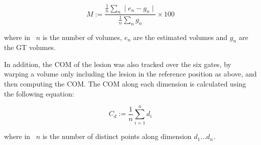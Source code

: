                \begin{equation} \label{eq:impact_of_tof_on_respiratory_motion_model_estimation_using_pre_gated_no_intra_cycle_motion_nac_pet_methods_mape}
                   M := \frac{\frac{1}{n}\sum_{n}\mid e_n - g_n \mid}{\frac{1}{n}\sum_{n}g_n} \times 100
                \end{equation}
                
                \noindent where in~ $n$ is the number of volumes, $e_n$ are the estimated volumes and $g_n$ are the \gls{GT} volumes.
                
                In addition, the \gls{COM} of the lesion was also tracked over the six gates, by warping a volume only including the lesion in the reference position as above, and then computing the \gls{COM}. The \gls{COM} along each dimension is calculated using the following equation:
                
                \begin{equation} \label{eq:impact_of_tof_on_respiratory_motion_model_estimation_using_pre_gated_no_intra_cycle_motion_nac_pet_methods_com}
                   C_{d} := \frac{1}{n}\sum_{i = 1}^{n} d_{i}
                \end{equation}
                
                \noindent where in~ $n$ is the number of distinct points along dimension $d_1 \dotso d_n$.
            
